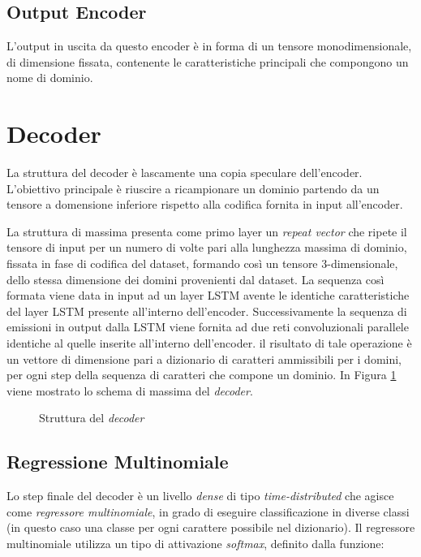 \subsection{Output Encoder}
L'output in uscita da questo encoder è in forma di un tensore monodimensionale, di dimensione fissata, contenente le caratteristiche principali che compongono un nome di dominio.

\section{Decoder}
\label{decoder}
La struttura del decoder è lascamente una copia speculare dell'encoder. L'obiettivo principale è riuscire a ricampionare un dominio partendo da un tensore a domensione inferiore rispetto alla codifica fornita in input all'encoder.

La struttura di massima presenta come primo layer un \textit{repeat vector} che ripete il tensore di input per un numero di volte pari alla lunghezza massima di dominio, fissata in fase di codifica del dataset, formando così un tensore 3-dimensionale, dello stessa dimensione dei domini provenienti dal dataset. La sequenza così formata viene data in input ad un layer LSTM avente le identiche caratteristiche del layer LSTM presente all'interno dell'encoder. Successivamente la sequenza di emissioni in output dalla LSTM viene fornita ad due reti convoluzionali parallele identiche al quelle inserite all'interno dell'encoder. il risultato di tale operazione è un vettore di dimensione pari a dizionario di caratteri ammissibili per i domini, per ogni step della sequenza di caratteri che compone un dominio. In Figura \ref{fig:decoder} viene mostrato lo schema di massima del \textit{decoder}.

\begin{figure}[!htb]
    \centering
	
	\caption{Struttura del \textit{decoder}}
\label{fig:decoder}
\end{figure}

\subsection{Regressione Multinomiale}
Lo step finale del decoder è un livello \textit{dense} di tipo \textit{time-distributed} che agisce come \textit{regressore multinomiale}, in grado di eseguire classificazione in diverse classi (in questo caso una classe per ogni carattere possibile nel dizionario). Il regressore multinomiale utilizza un tipo di attivazione \textit{softmax}, definito dalla funzione:

